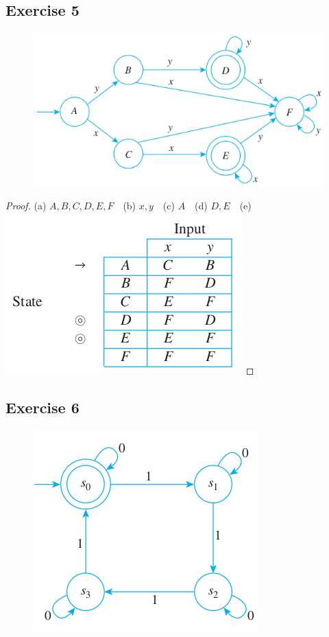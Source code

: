 \documentclass[14pt]{extarticle}
\begin{document}
\subsection{Exercise 5}
\begin{figure}[ht!]
    \centering
    \includegraphics[scale=0.5]{../images/12.2.5.png}
\end{figure}

\begin{proof}
    (a) \(A, B, C, D, E, F\) \,\, (b) \(x, y\) \,\, (c) \(A\) \,\,
    (d) \(D, E\) \,\, (e)
    \includegraphics[scale=0.5]{../images/12.2.5.e.png}
\end{proof}

\subsection{Exercise 6}
\begin{figure}[ht!]
    \centering
    \includegraphics[scale=0.5]{../images/12.2.6.png}
\end{figure}
\end{document}
